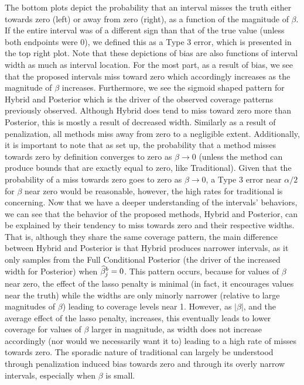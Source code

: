 The bottom plots depict the probability that an interval misses the truth either towards zero (left) or away from zero (right), as a function of the magnitude of $\beta$. If the entire interval was of a different sign than that of the true value (unless both endpoints were 0), we defined this as a Type 3 error, which is presented in the top right plot. Note that these depictions of bias are also functions of interval width as much as interval location. For the most part, as a result of bias, we see that the proposed intervals miss toward zero which accordingly increases as the magnitude of $\beta$ increases. Furthermore, we see the sigmoid shaped pattern for Hybrid and Posterior which is the driver of the observed coverage patterns previously observed. Although Hybrid does tend to miss toward zero more than Posterior, this is mostly a result of decreased width. Similarly as a result of penalization, all methods miss away from zero to a negligible extent. Additionally, it is important to note that as set up, the probability that a method misses towards zero by definition converges to zero as $\beta \rightarrow 0$ (unless the method can produce bounds that are exactly equal to zero, like Traditional). Given that the probability of a miss towards zero goes to zero as $\beta \rightarrow 0$, a Type 3 error near $\alpha / 2$ for $\beta$ near zero would be reasonable, however, the high rates for traditional is concerning. Now that we have a deeper understanding of the intervals' behaviors, we can see that the behavior of the proposed methods, Hybrid and Posterior, can be explained by their tendency to miss towards zero and their respective widths. That is, although they share the same coverage pattern, the main difference between Hybrid and Posterior is that Hybrid produces narrower intervals, as it only samples from the Full Conditional Posterior (the driver of the increased width for Posterior) when $\widehat{\beta}_j^b = 0$. This pattern occurs, because for values of $\beta$ near zero, the effect of the lasso penalty is minimal (in fact, it encourages values near the truth) while the widths are only minorly narrower (relative to large magnitudes of $\beta$) leading to coverage levels near 1. However, as $|\beta|$, and the average effect of the lasso penalty, increases, this eventually leads to lower coverage for values of $\beta$ larger in magnitude, as width does not increase accordingly (nor would we necessarily want it to) leading to a high rate of misses towards zero. The sporadic nature of traditional can largely be understood through penalization induced bias towards zero and through its overly narrow intervals, especially when $\beta$ is small.

